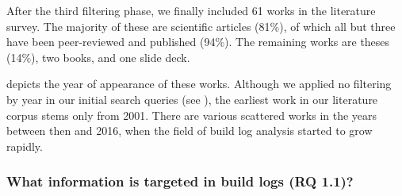 \documentclass[10pt,journal,compsoc]{IEEEtran}
\begin{document}
After the third filtering phase, we finally included 61 works in the
literature survey.
The majority of these are scientific articles (81\%), of which all but
three have been peer-reviewed and published (94\%).
The remaining works are theses (14\%), two books, and one slide deck.

 depicts the year of appearance of these
works.
Although we applied no filtering by year in our initial search queries
(see ), the earliest work in our literature corpus
stems only from 2001.
There are various scattered works in the years between then and 2016,
when the field of build log analysis started to grow rapidly.


\subsubsection{What information is targeted in build logs (RQ 1.1)?}
\label{sec:rq11}
\end{document}
